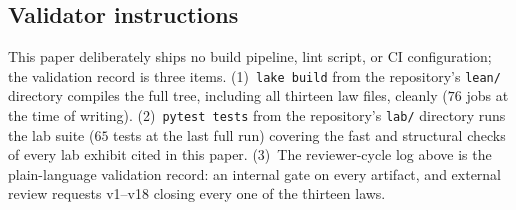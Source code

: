 \documentclass[11pt]{article}
\theoremstyle{definition}
\begin{document}
\subsection{Validator instructions}\label{subsec:validator-instructions}

This paper deliberately ships no build pipeline, lint script, or CI configuration; the validation
record is three items. (1)~\texttt{lake build} from the repository's \texttt{lean/} directory
compiles the full tree, including all thirteen law files, cleanly ($76$ jobs at the time of writing).
(2)~\texttt{pytest tests} from the repository's \texttt{lab/} directory runs the lab suite ($65$
tests at the last full run) covering the fast and structural checks of every lab exhibit cited in
this paper. (3)~The reviewer-cycle log above is the plain-language validation record: an internal
gate on every artifact, and external review requests v1--v18 closing every one of the thirteen laws.
 
\clearpage


\end{document}
